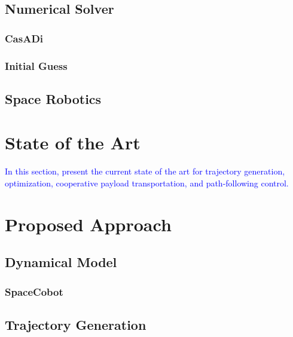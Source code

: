 \documentclass[a4paper, oneside]{article}
\begin{document}
\subsection{Numerical Solver}
\subsubsection{CasADi}


\subsubsection{Initial Guess}


\subsection{Space Robotics}





\clearpage
\section{State of the Art}
\textcolor{blue}{In this section, present the current state of the art for trajectory generation, optimization, cooperative payload transportation, and path-following control.}

\clearpage
\section{Proposed Approach}

\subsection{Dynamical Model}


\subsubsection{SpaceCobot}\label{sec:Proposed Approach: Dynamical Model: Space Cobot}



\subsection{Trajectory Generation}
\end{document}
